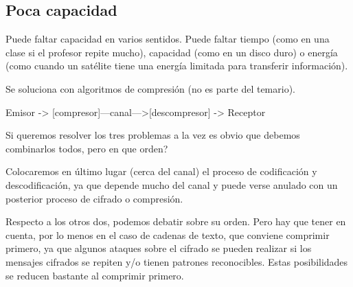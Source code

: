 	\subsection{Poca capacidad}

		Puede faltar capacidad en varios sentidos. Puede faltar tiempo (como en una clase si el profesor repite mucho), capacidad (como en un disco duro) o energía (como cuando un satélite tiene una energía limitada para transferir información).

		Se soluciona con algoritmos de compresión (no es parte del temario).

		Emisor -> [compresor]---canal--->[descompresor] -> Receptor

	\vspace{1cm}


	Si queremos resolver los tres problemas a la vez es obvio que debemos combinarlos todos, pero en que orden?

	Colocaremos en último lugar (cerca del canal) el proceso de codificación y descodificación, ya que depende mucho del canal y puede verse anulado con un posterior proceso de cifrado o compresión.

	Respecto a los otros dos, podemos debatir sobre su orden. Pero hay que tener en cuenta, por lo menos en el caso de cadenas de texto, que conviene comprimir primero, ya que algunos ataques sobre el cifrado se pueden realizar si los mensajes cifrados se repiten y/o tienen patrones reconocibles. Estas posibilidades se reducen bastante al comprimir primero.






